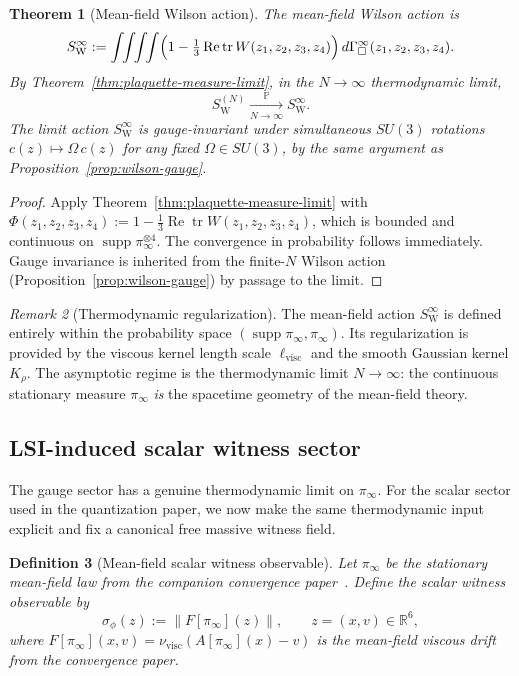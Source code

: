 \documentclass[11pt]{article}
\newtheorem{theorem}{Theorem}[section]
\newtheorem{definition}[theorem]{Definition}
\theoremstyle{remark}
\newtheorem{remark}[theorem]{Remark}
\newcommand{\R}{\mathbb R}
\begin{document}
\begin{theorem}[Mean-field Wilson action]
\label{thm:mf-wilson}
The \emph{mean-field Wilson action} is
\[
S_{\mathrm W}^\infty
:=
\int\!\!\int\!\!\int\!\!\int
\Bigl(1-\tfrac13\operatorname{Re}\operatorname{tr}
W(z_1,z_2,z_3,z_4)\Bigr)
\,d\Gamma_\square^\infty(z_1,z_2,z_3,z_4).
\]
By Theorem~\ref{thm:plaquette-measure-limit}, in the $N\to\infty$ thermodynamic
limit,
\[
S_{\mathrm W}^{(N)}
\xrightarrow[N\to\infty]{\mathbb P}
S_{\mathrm W}^\infty.
\]
The limit action $S_{\mathrm W}^\infty$ is gauge-invariant under simultaneous
$SU(3)$ rotations $c(z)\mapsto\Omega\,c(z)$ for any fixed $\Omega\in SU(3)$,
by the same argument as Proposition~\ref{prop:wilson-gauge}.
\end{theorem}
\begin{proof}
Apply Theorem~\ref{thm:plaquette-measure-limit} with $\Phi(z_1,z_2,z_3,z_4)
:=1-\tfrac13\operatorname{Re}\operatorname{tr}W(z_1,z_2,z_3,z_4)$, which is
bounded and continuous on $\operatorname{supp}\pi_\infty^{\otimes 4}$.
The convergence in probability follows immediately.
Gauge invariance is inherited from the finite-$N$ Wilson action
(Proposition~\ref{prop:wilson-gauge}) by passage to the limit.
\end{proof}

\begin{remark}[Thermodynamic regularization]
\label{rem:no-lattice-spacing}
The mean-field action $S_{\mathrm W}^\infty$ is defined entirely within the
probability space $(\operatorname{supp}\pi_\infty, \pi_\infty)$.
Its regularization is provided by the viscous kernel length scale
$\ell_{\mathrm{visc}}$ and the smooth Gaussian kernel $K_\rho$.
The asymptotic regime is the thermodynamic limit $N\to\infty$:
the continuous stationary measure $\pi_\infty$ \emph{is} the spacetime geometry
of the mean-field theory.
\end{remark}

\subsection{LSI-induced scalar witness sector}

The gauge sector has a genuine thermodynamic limit on $\pi_\infty$.
For the scalar sector used in the quantization paper, we now make the same
thermodynamic input explicit and fix a canonical free massive witness field.

\begin{definition}[Mean-field scalar witness observable]
\label{def:scalar-witness}
Let $\pi_\infty$ be the stationary mean-field law from the companion
convergence paper~\cite{convergence}.  Define the scalar witness observable by
\[
\sigma_\phi(z):=\|F[\pi_\infty](z)\|,
\qquad
z=(x,v)\in\R^6,
\]
where $F[\pi_\infty](x,v)=\nu_{\mathrm{visc}}(A[\pi_\infty](x)-v)$ is the
mean-field viscous drift from the convergence paper.
\end{definition}
\end{document}
